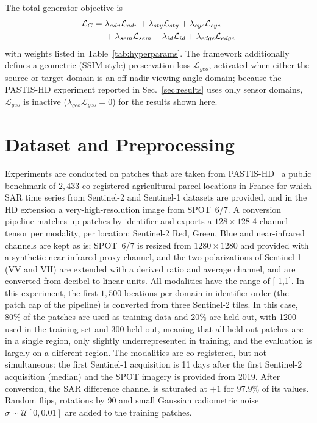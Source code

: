 \documentclass[conference]{IEEEtran}
\begin{document}
The total generator objective is
\begin{align}
\mathcal{L}_G ={}& \lambda_{adv}\mathcal{L}_{adv} + \lambda_{sty}\mathcal{L}_{sty} + \lambda_{cyc}\mathcal{L}_{cyc} \notag \\
& + \lambda_{sem}\mathcal{L}_{sem} + \lambda_{id}\mathcal{L}_{id} + \lambda_{edge}\mathcal{L}_{edge}
\label{eq:total}
\end{align}
with weights listed in Table~\ref{tab:hyperparams}. The framework additionally defines a geometric (SSIM-style) preservation loss $\mathcal{L}_{geo}$, activated when either the source or target domain is an off-nadir viewing-angle domain; because the PASTIS-HD experiment reported in Sec.~\ref{sec:results} uses only sensor domains, $\mathcal{L}_{geo}$ is inactive ($\lambda_{geo}\mathcal{L}_{geo}=0$) for the results shown here.

\section{Dataset and Preprocessing}
\label{sec:dataset}
Experiments are conducted on patches that are taken from PASTIS-HD~\cite{garnot2021panoptic,astruc2024omnisat} a public benchmark of $2{,}433$ co-registered agricultural-parcel locations in France for which SAR time series from Sentinel-2 and Sentinel-1 datasets are provided, and in the HD extension a very-high-resolution image from SPOT~6/7. A conversion pipeline matches up patches by identifier and exports a $128\times128$ 4-channel tensor per modality, per location: Sentinel-2 Red, Green, Blue and near-infrared channels are kept as is; SPOT~6/7 is resized from $1280\times1280$ and provided with a synthetic near-infrared proxy channel, and the two polarizations of Sentinel-1 (VV and VH) are extended with a derived ratio and average channel, and are converted from decibel to linear units. All modalities have the range of [-1,1]. In this experiment, the first $1{,}500$ locations per domain in identifier order (the patch cap of the pipeline) is converted from three Sentinel-2 tiles. In this case, 80\% of the patches are used as training data and 20\% are held out, with 1200 used in the training set and 300 held out, meaning that all held out patches are in a single region, only slightly underrepresented in training, and the evaluation is largely on a different region. The modalities are co-registered, but not simultaneous: the first Sentinel-1 acquisition is 11 days after the first Sentinel-2 acquisition (median) and the SPOT imagery is provided from 2019. After conversion, the SAR difference channel is saturated at $+1$ for 97.9\% of its values. Random flips, rotations by 90\textdegree{} and small Gaussian radiometric noise $\sigma \sim \mathcal{U}[0, 0.01]$ are added to the training patches.
\end{document}
